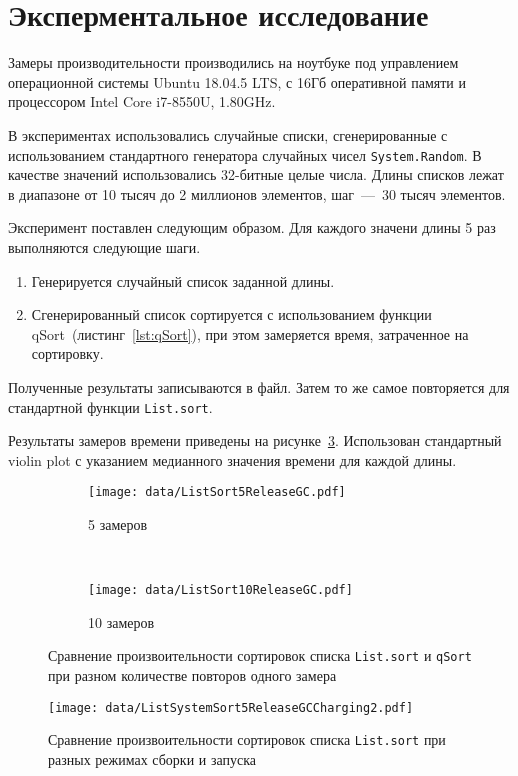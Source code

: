 \section{Эксперментальное исследование}

Замеры производительности производились на ноутбуке под управлением операционной системы Ubuntu 18.04.5 LTS, с 16Гб оперативной памяти и процессором Intel Core i7-8550U, 1.80GHz.  

В экспериментах использовались случайные списки, сгенерированные с использованием стандартного генератора случайных чисел \verb|System.Random|.
В качестве значений использовались 32-битные целые числа.
Длины списков лежат в диапазоне от 10 тысяч до 2 миллионов элементов, шаг~---~30 тысяч элементов.

Эксперимент поставлен следующим образом. 
Для каждого значени длины 5 раз выполняются следующие шаги.
\begin{enumerate}
  \item Генерируется случайный список заданной длины.
  \item Сгенерированный список сортируется с использованием функции qSort~(листинг~\ref{lst:qSort}), при этом замеряется время, затраченное на сортировку. 
\end{enumerate}

Полученные результаты записываются в файл.
Затем то же самое повторяется для стандартной функции \verb|List.sort|.

Результаты замеров времени приведены на рисунке~\ref{fig:list_sort}.
Использован стандартный violin plot с указанием медианного значения времени для каждой длины.


\begin{figure}
	\centering
	\begin{subfigure}[b]{0.48\textwidth}
       \centering
	   \texttt{[image: data/ListSort5ReleaseGC.pdf]}
	   \caption{5 замеров}
	   \label{fig:list_sort_5}
	\end{subfigure}~
	\begin{subfigure}[b]{0.48\textwidth}
       \centering
	   \texttt{[image: data/ListSort10ReleaseGC.pdf]}
	   \caption{10 замеров}
	   \label{fig:list_sort_10}
	\end{subfigure}
	\caption{Сравнение произвоительности сортировок списка \texttt{List.sort} и \texttt{qSort} при разном количестве повторов одного замера}
	\label{fig:list_sort}	
\end{figure}


\begin{figure}
	\centering
    \texttt{[image: data/ListSystemSort5ReleaseGCCharging2.pdf]}
	\caption{Сравнение произвоительности сортировок списка \texttt{List.sort} при разных режимах сборки и запуска}
	\label{fig:list_sort_system}	
\end{figure}





